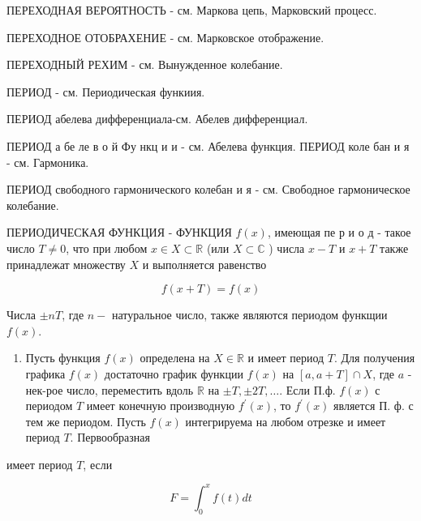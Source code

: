 \documentclass[10pt]{article}
\begin{document}
ПЕРЕХОДНАЯ ВЕРОЯТНОСТЬ - см. Маркова цепь, Марковский процесс.



ПЕРЕХОДНОЕ ОТОБРАХЕНИЕ - см. Марковское отображение.



ПЕРЕХОДНЫЙ РЕХИМ - см. Вынужденное колебание.



ПЕРИОД - см. Периодическая функиия.



ПЕРИОД абелева дифференциала-см. Абелев дифференциал.



ПЕРИОД а бе ле в о й Фу нкц и и - см. Абелева функция. ПЕРИОД коле бан и я - см. Гармоника.



ПЕРИОД свободного гармонического колебан и я - см. Свободное гармоническое колебание.



ПЕРИОДИЧЕСКАЯ ФУНКЦИЯ - ФУНКЦИЯ $f(x)$, имеющая пе р и о д - такое число $T \neq 0$, что при любом $x \in X \subset \mathbb{R}$ (или $X \subset \mathbb{C}$ ) числа $x-T$ и $x+T$ также принадлежат множеству $X$ и выполняется равенство



\[

f(x+T)=f(x)

\]



Числа $\pm n T$, где $n-$ натуральное число, также являются периодом функщии $f(x)$.



\begin{enumerate}

  \item Пусть функция $f(x)$ определена на $X \in \mathbb{R}$ и имеет период $T$. Для получения графика $f(x)$ достаточно график функции $f(x)$ на $[a, a+T] \cap X$, где $a$ - нек-рое число, переместить вдоль $\mathbb{R}$ на $\pm T, \pm 2 T, \ldots$. Если П.ф. $f(x)$ с периодом $T$ имеет конечную производную $f^{\prime}(x)$, то $f^{\prime}(x)$ является П. ф. с тем же периодом. Пусть $f(x)$ интегрируема на любом отрезке и имеет период $T$. Первообразная

\end{enumerate}



имеет период $T$, если



\[

F=\int_{0}^{x} f(t) d t

\]
\end{document}
